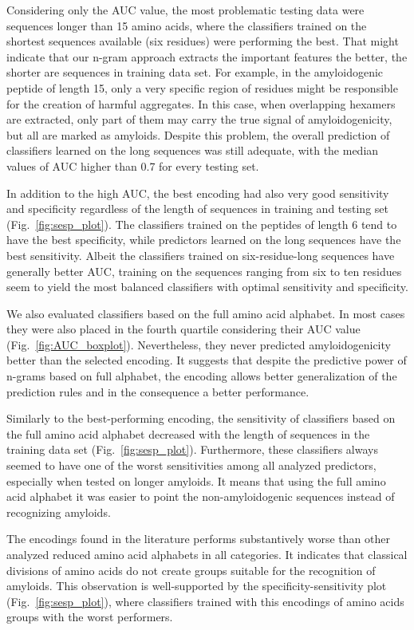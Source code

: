 \documentclass{bioinfo}
\begin{document}
  Considering only the AUC value, the most problematic testing data were 
sequences longer than 15 amino acids, where the classifiers trained on 
the shortest sequences available (six residues) were performing the best. That 
might indicate that our n-gram approach extracts the important features the 
better, the shorter are sequences in training data set. For example, in the 
amyloidogenic peptide of length 15, only a very specific region of residues 
might be responsible for the creation of harmful aggregates. In this case, when 
overlapping hexamers are extracted, only part of them may carry 
the true signal of amyloidogenicity, but all are marked as amyloids. 
Despite this problem, the overall prediction of classifiers learned on the long 
sequences was still adequate, with the median values of AUC higher than 0.7 for 
every testing set. 

  In addition to the high AUC, the best encoding had also very good sensitivity 
and specificity regardless of the length of sequences in training and testing 
set (Fig.~\ref{fig:sesp_plot}). The classifiers trained on the peptides of 
length 6 tend to have the best specificity, while predictors learned on the long 
sequences have the best sensitivity. Albeit the classifiers trained on 
six-residue-long sequences have generally better AUC, training on 
the sequences ranging from six to ten residues seem to yield the most balanced 
classifiers with optimal sensitivity and specificity.

  We also evaluated classifiers based on the full amino acid alphabet. In most 
cases they were also placed in the fourth quartile considering their AUC value 
(Fig.~\ref{fig:AUC_boxplot}). Nevertheless, they never predicted 
amyloidogenicity better than the selected encoding. It suggests that despite the 
predictive power of n-grams based on full alphabet, the encoding allows better 
generalization of the prediction rules and in the consequence a better 
performance.

  Similarly to the best-performing encoding, the sensitivity of classifiers 
based on the full amino acid alphabet decreased with the length of sequences in 
the training data set (Fig.~\ref{fig:sesp_plot}). Furthermore, these classifiers 
always seemed to  have one of the worst sensitivities among all analyzed 
predictors, especially when tested on longer amyloids. It means that using the 
full amino acid alphabet it was easier to point the non-amyloidogenic sequences 
instead of recognizing amyloids.

  The encodings found in the literature performs substantively worse than other 
analyzed reduced amino acid alphabets in all categories. It indicates that classical 
divisions of amino acids do not create groups suitable for the recognition of 
amyloids. This observation is well-supported by the specificity-sensitivity 
plot (Fig.~\ref{fig:sesp_plot}), where classifiers trained with this encodings 
of amino acids groups with the worst performers.
\end{document}
